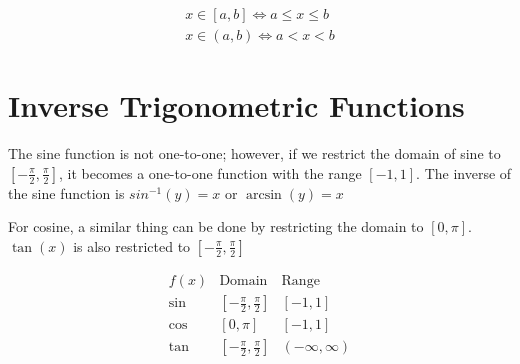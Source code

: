 \documentclass{article}
\theoremstyle{mytheoremstyle}
\theoremstyle{mytheoremstyle}
\theoremstyle{myproblemstyle}
\begin{document}
    \begin{align*}
        x\in [a,b] \Leftrightarrow a \le x \le b \\
        x\in (a,b) \Leftrightarrow a < x < b
    \end{align*}

    \section*{Inverse Trigonometric Functions}
    The sine function is not one-to-one; however, if we restrict the domain of
    sine to $[ -\frac{\pi}{2}, \frac{\pi}{2} ]$, it becomes a one-to-one
    function with the range $[-1,1]$. The inverse of the sine function is
    $sin^{-1}(y) = x$ or $\arcsin(y)= x$

    For cosine, a similar thing can be done by restricting the domain to
    $[0,\pi]$. $\tan(x)$ is also restricted to $[ -\frac{\pi}{2},
    \frac{\pi}{2}]$

    \begin{equation*}
        \begin{matrix}
            f(x) & \text{Domain} & \text{Range} \\
            \sin & [ -\frac{\pi}{2}, \frac{\pi}{2} ] & [-1,1] \\
            \cos & [ 0, \pi ] & [-1,1] \\
            \tan & [ -\frac{\pi}{2}, \frac{\pi}{2} ] & (-\infty, \infty)
        \end{matrix}
    \end{equation*}
\end{document}
